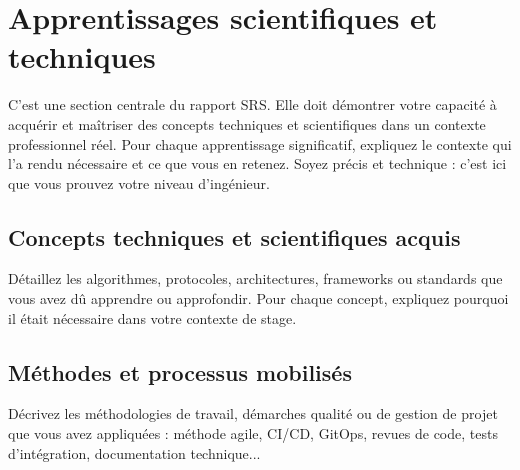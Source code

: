 \section{Apprentissages scientifiques et techniques}

\begin{guideline}
C'est une section centrale du rapport SRS. Elle doit démontrer votre
capacité à acquérir et maîtriser des concepts techniques et scientifiques
dans un contexte professionnel réel. Pour chaque apprentissage
significatif, expliquez le contexte qui l'a rendu nécessaire et ce que
vous en retenez. Soyez précis et technique : c'est ici que vous prouvez
votre niveau d'ingénieur.
\end{guideline}


\subsection{Concepts techniques et scientifiques acquis}

\begin{guideline}
Détaillez les algorithmes, protocoles, architectures, frameworks ou
standards que vous avez dû apprendre ou approfondir. Pour chaque concept,
expliquez pourquoi il était nécessaire dans votre contexte de stage.
\end{guideline}



\subsection{Méthodes et processus mobilisés}

\begin{guideline}
Décrivez les méthodologies de travail, démarches qualité ou de gestion
de projet que vous avez appliquées : méthode agile, CI/CD, GitOps,
revues de code, tests d'intégration, documentation technique...
\end{guideline}



